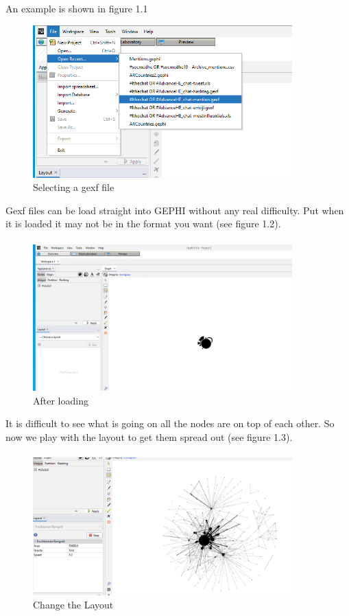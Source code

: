 An example is shown in figure 1.1
\begin{figure}
    \centering
    \includegraphics[width=10cm]{chapter/Chpsocioviz1/gephi1.png}
    \caption{Selecting a gexf file}
    \label{fig:GexfSelection}
\end{figure}
\newline
Gexf files can be load straight into GEPHI without any real difficulty. Put when it is loaded it may not be in the format you want (see figure 1.2). \paragraph{}
\begin{figure}
    \centering 
    \includegraphics[width=10cm]{chapter/Chpsocioviz1/gephi2.png}
    \caption{After loading}
    \label{fig:afterload}
\end{figure}
It is difficult to see what is going on all the nodes are on top of each other. So now we play with the layout to get them spread out (see figure 1.3).\paragraph{}
\begin{figure}
    \centering
    \includegraphics[width=10cm]{chapter/Chpsocioviz1/gephi3.png}
    \caption{Change the Layout}
    \label{fig:layoutchange}
\end{figure}
